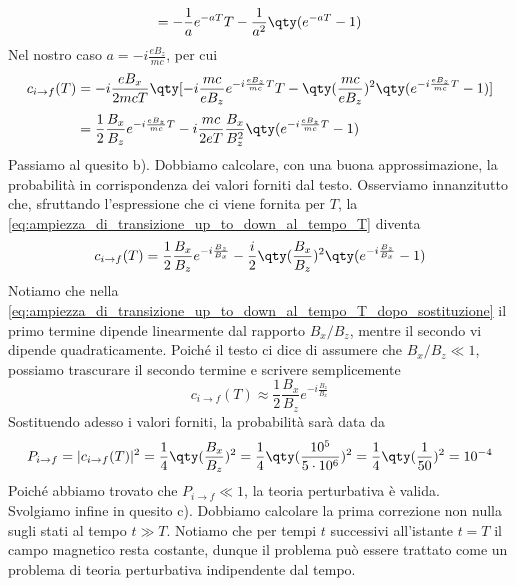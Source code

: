 \begin{soluzione}
\begin{equation*}
      =-\frac{1}{a} e^{-a T} T - \frac{1}{a^2} \qty( e^{-a T} - 1 )
   \end{equation*}
   Nel nostro caso $a=-i \frac{e B_z}{m c}$, per cui
   \begin{equation}
      \begin{split}
         c_{i \to f}(T)
         & =-i \frac{e B_x}{2 m c T} \qty[ -i \frac{m c}{e B_z} e^{-i \frac{e B_z}{m c} T} T
         - \qty(\frac{m c}{e B_z})^2 \qty( e^{-i \frac{e B_z}{m c} T} - 1 ) ]
         \\[0.1cm]
         & =\frac{1}{2} \frac{B_x}{B_z} e^{-i \frac{e B_z}{m c} T}
         - i \frac{m c}{2 e T} \frac{B_x}{B_z^2} \qty( e^{-i \frac{e B_z}{m c} T} - 1 )
      \end{split}
      \label{eq:ampiezza_di_transizione_up_to_down_al_tempo_T}
   \end{equation}
   Passiamo al quesito b). Dobbiamo calcolare, con una buona approssimazione, la probabilità in corrispondenza dei valori forniti dal testo. Osserviamo innanzitutto che, sfruttando l'espressione che ci viene fornita per $T$, la \eqref{eq:ampiezza_di_transizione_up_to_down_al_tempo_T} diventa
   \begin{equation}
      c_{i \to f}(T)
      =\frac{1}{2} \frac{B_x}{B_z} e^{-i \frac{B_z}{B_x}}
      - \frac{i}{2} \qty(\frac{B_x}{B_z})^2 \qty( e^{-i \frac{B_z}{B_x}} - 1 )
      \label{eq:ampiezza_di_transizione_up_to_down_al_tempo_T_dopo_sostituzione}
   \end{equation}
   Notiamo che nella \eqref{eq:ampiezza_di_transizione_up_to_down_al_tempo_T_dopo_sostituzione} il primo termine dipende linearmente dal rapporto $B_x/B_z$, mentre il secondo vi dipende quadraticamente. Poiché il testo ci dice di assumere che $B_x/B_z \ll 1$, possiamo trascurare il secondo termine e scrivere semplicemente
   \begin{equation*}
      c_{i \to f}(T)
      \approx \frac{1}{2} \frac{B_x}{B_z} e^{-i \frac{B_z}{B_x}}
   \end{equation*}
   Sostituendo adesso i valori forniti, la probabilità sarà data da
   \begin{equation*}
      P_{i \to f}
      =| c_{i \to f}(T) |^2
      =\frac{1}{4} \qty(\frac{B_x}{B_z})^2
      =\frac{1}{4} \qty(\frac{10^5}{5 \cdot 10^6})^2
      =\frac{1}{4} \qty(\frac{1}{50})^2
      =10^{-4}
   \end{equation*}
   Poiché abbiamo trovato che $P_{i \to f} \ll 1$, la teoria perturbativa è valida.\\
   Svolgiamo infine in quesito c). Dobbiamo calcolare la prima correzione non nulla sugli stati al tempo $t \gg T$. Notiamo che per tempi $t$ successivi all'istante $t=T$ il campo magnetico resta costante, dunque il problema può essere trattato come un problema di teoria perturbativa indipendente dal tempo.\\

\end{soluzione}
